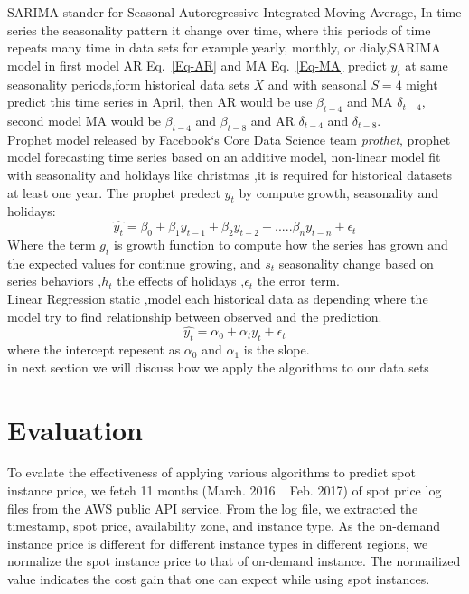 \documentclass[graybox]{svmult}
\begin{document}
SARIMA stander for Seasonal Autoregressive Integrated Moving Average, In time series the seasonality pattern it change over time, where this periods of time repeats many time in data sets for example yearly, monthly, or dialy,SARIMA model in first model AR Eq.~\ref{Eq-AR} and MA Eq.~\ref{Eq-MA}  predict \(y_i\) at same seasonality periods,form historical data sets \(X\) and with seasonal \(S = 4\)  might predict this time series in April, then AR would be use \(\beta_{t-4}\) and MA  \(\delta_{t-4}\), second model MA would be  \(\beta_{t-4}\)  and \(\beta_{t-8}\) and AR \(\delta_{t-4}\) and \(\delta_{t-8}\).\\
Prophet model released by Facebook`s Core Data Science team \emph{prothet}, prophet model forecasting time series based on an additive model, non-linear model fit with seasonality and holidays like christmas ,it is required for historical datasets at least one year.
The prophet predect \(y_t\) by compute growth, seasonality and holidays:
\begin{equation}
\hat{y_t} = \beta_0 +\beta_1 y_{t-1}+ \beta_2 y_{t-2}+.....\beta_n y_{t-n}+\epsilon_t
\label{Eq-prophet}
\end{equation}
Where the term \(g_t\) is growth function to compute how the series has grown and the expected values for continue growing, and \(s_t\) seasonality change based on series behaviors ,\(h_t\) the effects of holidays ,\(\epsilon_t\) the error term.\\
Linear Regression static ,model each historical data as depending where the model try to find relationship between observed and the prediction.
\begin{equation}
\hat{y_t} = \alpha_0 + \alpha_t y_t +\epsilon_t
\label{Eq-LR}
\end{equation}
where the intercept repesent as \(\alpha_0\) and \(\alpha_1 \) is the slope.\\
in next section we will discuss how we apply the algorithms to our data sets
\section{Evaluation}
To evalate the effectiveness of applying various algorithms to predict spot instance price, we fetch 11 months (March. 2016 ~ Feb. 2017) of spot price log files from the AWS public API service. From the log file, we extracted the timestamp, spot price, availability zone, and instance type. As the on-demand instance price is different for different instance types in different regions, we normalize the spot instance price to that of on-demand instance. The normailized value indicates the cost gain that one can expect while using spot instances.
\end{document}
